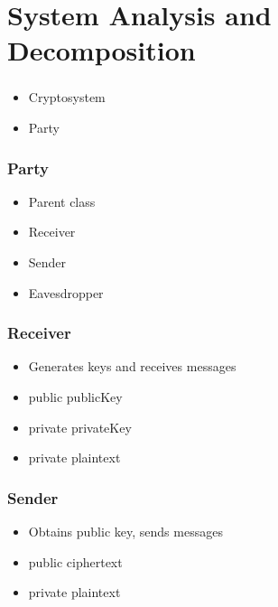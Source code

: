 \section{System Analysis and Decomposition}


\begin{frame}
\frametitle{\Cry{}}
\begin{itemize}
  \item Cryptosystem
  \item Party
\end{itemize}
\end{frame}


\begin{frame}
\frametitle{Party}
\begin{itemize}
  \item Parent class
  \item Receiver
  \item Sender
  \item Eavesdropper
\end{itemize}
\end{frame}


\begin{frame}
\frametitle{Receiver}
\begin{itemize}
  \item Generates keys and receives messages
  \item public publicKey
  \item private privateKey
  \item private plaintext
\end{itemize}
\end{frame}


\begin{frame}
\frametitle{Sender}
\begin{itemize}
  \item Obtains public key, sends messages
  \item public ciphertext
  \item private plaintext
\end{itemize}
\end{frame}

